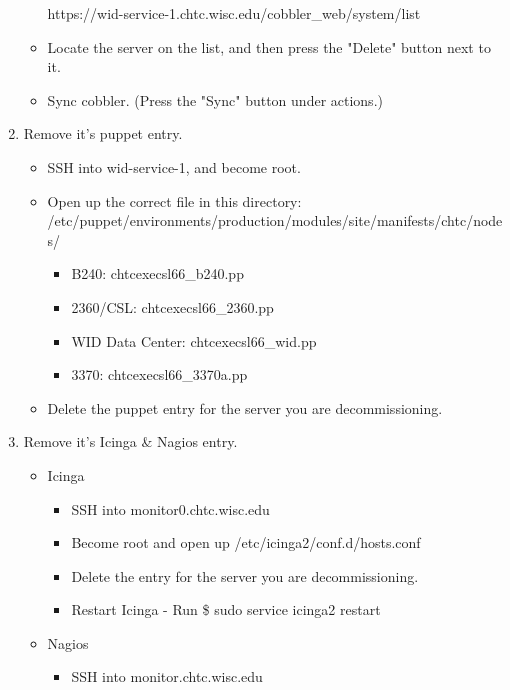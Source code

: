 \documentclass[10pt,letterpaper]{article}
\begin{document}
\begin{enumerate}
\begin{itemize}
                https://wid-service-1.chtc.wisc.edu/cobbler\_web/system/list
                \item Locate the server on the list, and then press the "Delete" button next to it.
                \item Sync cobbler. (Press the "Sync" button under actions.)
            \end{itemize}
        \item Remove it's puppet entry.
            \begin{itemize}
                \item SSH into wid-service-1, and become root.
                \item Open up the correct file in this directory: /etc/puppet/environments/production/modules/site/manifests/chtc/nodes/
                \begin{itemize}
                    \item B240: chtcexecsl66\_b240.pp
                    \item 2360/CSL: chtcexecsl66\_2360.pp
                    \item WID Data Center: chtcexecsl66\_wid.pp
                    \item 3370: chtcexecsl66\_3370a.pp
                \end{itemize}
                \item Delete the puppet entry for the server you are decommissioning.
            \end{itemize}
        \item Remove it's Icinga \& Nagios entry.
            \begin{itemize}
                \item Icinga
                \begin{itemize}
                    \item SSH into monitor0.chtc.wisc.edu
                    \item Become root and open up /etc/icinga2/conf.d/hosts.conf
                    \item Delete the entry for the server you are decommissioning.
                    \item Restart Icinga - Run {\selectfont \$ sudo service icinga2 restart }
                \end{itemize}
                \item Nagios
                \begin{itemize}
                    \item SSH into monitor.chtc.wisc.edu

\end{itemize}
\end{itemize}
\end{enumerate}
\end{document}

